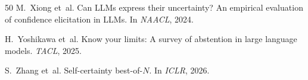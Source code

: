 \documentclass[11pt,a4paper]{article}
\begin{document}
\begin{thebibliography}{50}
M.~Xiong et~al.
\newblock Can {LLM}s express their uncertainty? An empirical evaluation of confidence elicitation in {LLM}s.
\newblock In \emph{NAACL}, 2024.

H.~Yoshikawa et~al.
\newblock Know your limits: A survey of abstention in large language models.
\newblock \emph{TACL}, 2025.

S.~Zhang et~al.
\newblock Self-certainty best-of-$N$.
\newblock In \emph{ICLR}, 2026.

\end{thebibliography}
\end{document}
